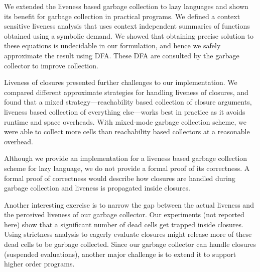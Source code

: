 \documentclass[preprint,9pt]{sigplanconf}
\begin{document}

We extended  the liveness  based garbage  collection to
lazy  languages  and  shown  its  benefit  for  garbage
collection in practical programs.  We defined a context
sensitive   liveness   analysis   that   uses   context
independent  summaries of  functions  obtained using  a
symbolic  demand.  We  showed  that  obtaining  precise
solution  to  these  equations is  undecidable  in  our
formulation, and hence we safely approximate the result
using  DFA.  These DFA  are  consulted  by the  garbage
collector to improve collection.

Liveness  of closures  presented further  challenges to
our implementation.  We  compared different approximate
strategies for handling liveness of closures, and found
that a  mixed strategy---reachability  based collection
of  closure  arguments,  liveness based  collection  of
everything else---works  best in practice as  it avoids
runtime and  space overheads.  With  mixed-mode garbage
collection scheme,  we were able to  collect more cells
than  reachability  based  collectors at  a  reasonable
overhead.

Although we  provide an  implementation for  a liveness
based garbage  collection scheme for lazy  language, we
do not  provide a formal  proof of its  correctness.  A
formal proof of correctness would describe how closures
are handled  during garbage collection and  liveness is
propagated inside closures.

  Another  interesting exercise  is to  narrow the  gap
  between  the   actual  liveness  and   the  perceived
  liveness  of our  garbage collector.  Our experiments
  (not reported here) show that a significant number of
  dead  cells  get   trapped  inside  closures.   Using
  strictness  analysis  to  eagerly  evaluate  closures
  might release more of these  dead cells to be garbage
  collected.   Since our  garbage collector  can handle
  closures   (suspended  evaluations),   another  major
  challenge  is to  extend it  to support  higher order
  programs.
\end{document}
